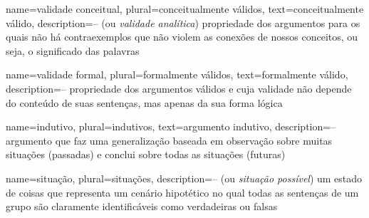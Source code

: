 {
 name=validade conceitual,
 plural=conceitualmente válidos,
 text=conceitualmente válido,
 description={-- (ou \textit{validade analítica}) propriedade dos argumentos para os quais não há contraexemplos que não violem as conexões de nossos conceitos, ou seja, o significado das palavras}
}

{
 name=validade formal,
 plural=formalmente válidos,
 text=formalmente válido,
 description={-- propriedade dos argumentos válidos e cuja validade não depende do conteúdo de suas sentenças, mas apenas da sua forma lógica}
}

{
 name=indutivo,
 plural=indutivos,
 text=argumento indutivo,
 description={-- argumento que faz uma generalização baseada em observação sobre muitas situações (passadas) e conclui sobre todas as situações (futuras)}
}


{
 name=situação,
 plural=situações,
 description={-- (ou \textit{situação possível}) um estado de coisas que representa um cenário hipotético no qual todas as sentenças de um grupo são claramente identificáveis como verdadeiras ou falsas}
}